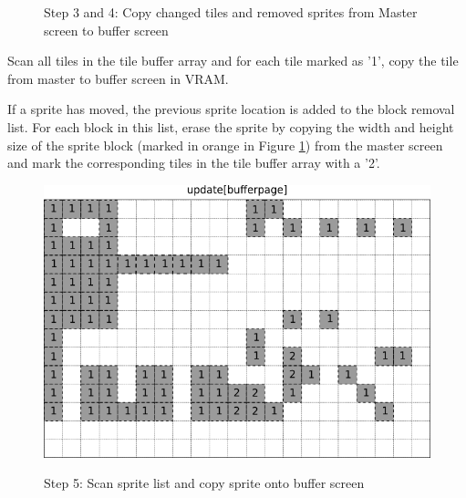 \documentclass[book.tex]{subfiles}
\begin{document}
\pagebreak

\begin{figure}[H]
\centering
 \caption{Step 3 and 4: Copy changed tiles and removed sprites from Master screen to buffer screen}
 \label{fig:kc1_3_update_remove}
\end{figure}


\begin{minipage}{.4\textwidth}
Scan all tiles in the tile buffer array and for each tile marked as '1', copy the tile from master to buffer screen in VRAM.\\
\par
If a sprite has moved, the previous sprite location is added to the block removal list. For each block in this list, erase the sprite by copying the width and height size of the sprite block (marked in orange in Figure \ref{fig:kc1_3_update_remove}) from the master screen and mark the corresponding tiles in the tile buffer array with a '2'.
 \end{minipage}
\begin{minipage}{.6\textwidth}
\begin{figure}[H]
  \centering
 \includegraphics[width=.9\textwidth]{screenshots_300dpi/game/Scroll_KC1-3_1-update_remove.png}
 \label{fig:kc1_3_update_remove_img_1}  
\end{figure}
\end{minipage}

\pagebreak

\begin{figure}[H]
\centering
 \caption{Step 5: Scan sprite list and copy sprite onto buffer screen}
 \label{fig:kc1_3_update_sprite}
\end{figure}
\end{document}
